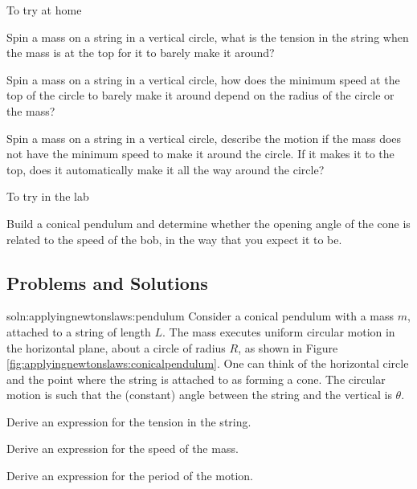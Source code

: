 \begin{chapteractivity}{To try at home}
{
\item Spin a mass on a string in a vertical circle, what is the tension in the string when the mass is at the top for it to barely make it around?
\item Spin a mass on a string in a vertical circle, how does the minimum speed at the top of the circle to barely make it around  depend on the radius of the circle or the mass?
\item Spin a mass on a string in a vertical circle, describe the motion if the mass does not have the minimum speed to make it around the circle. If it makes it to the top, does it automatically make it all the way around the circle?
}
\end{chapteractivity}

\begin{chapteractivity}{To try in the lab}
{
\item Build a conical pendulum and determine whether the opening angle of the cone is related to the speed of the bob, in the way that you expect it to be.
}
\end{chapteractivity}

\newpage
\subsection{Problems and Solutions}

\begin{problemParts}{soln:applyingnewtonslaws:pendulum}{\label{prob:applyingnewtonslaws:pendulum} Consider a conical pendulum with a mass $m$, attached to a string of length $L$. The mass executes uniform circular motion in the horizontal plane, about a circle of radius $R$, as shown in Figure \ref{fig:applyingnewtonslaws:conicalpendulum}. One can think of the horizontal circle and the point where the string is attached to as forming a cone. The circular motion is such that the (constant) angle between the string and the vertical is $\theta$.}{
\item Derive an expression for the tension in the string.
\item Derive an expression for the speed of the mass.
\item Derive an expression for the period of the motion.
}
\end{problemParts}


